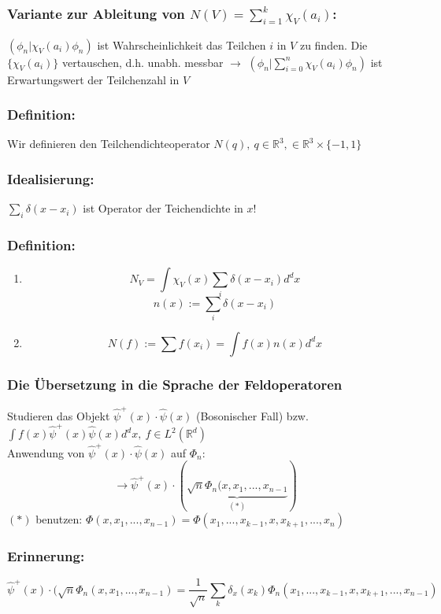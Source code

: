 \documentclass[twoside,a4paper]{scrartcl}
\newcommand{\R}{\mathbb{R}}
\renewcommand{\1}{\mathds{1}}
\newcommand{\ra}{\rightarrow}
\renewcommand{\R}{\mathbb{R}}
\begin{document}
\subsubsection*{Variante zur Ableitung von $N(V)=\sum_{i=1}^k \chi_V(a_i)$:}
$(\phi_n|\chi_V(a_i)\phi_n)$ ist Wahrscheinlichkeit das Teilchen $i$ in $V$ zu finden. Die $\{\chi_V(a_i)\}$ vertauschen, d.h. unabh. messbar $\ra$ $(\phi_n|\sum_{i=0}^n \chi_V(a_i)\phi_n)$ ist Erwartungswert der Teilchenzahl in $V$
\subsubsection*{Definition:}
Wir definieren den Teilchendichteoperator $N(q), \ q \in \R^3, \in \R^3 \times \{-1,1\}$ 


\subsubsection*{Idealisierung:}
$\sum_i \delta(x-x_i)$ ist Operator der Teichendichte in $x$!
\subsubsection*{Definition:}
\begin{enumerate}
\item $$N_V=\int \chi_V(x)\sum_i \delta(x-x_i) d^dx$$
$$n(x):= \sum_i \delta(x-x_i)$$
\item $$N(f):= \sum f(x_i)=\int f(x) n(x) d^dx$$
\end{enumerate}
\subsubsection{Die Übersetzung in die Sprache der Feldoperatoren}
Studieren das Objekt $\hat \psi^+(x) \cdot \hat \psi(x)$ (Bosonischer Fall) bzw. $\int f(x) \hat \psi^+(x)\hat \psi(x)d^dx, \ f\in L^2(\R^d)$\\
Anwendung von $\hat \psi^+(x) \cdot \hat \psi(x)$  auf $\Phi_n$:
$$\ra \hat \psi^+(x) \cdot (\underbrace{\sqrt{n}\Phi_n(x,x_1,...,x_{n-1}}_{(*)})$$
$(*)$ benutzen: $\Phi(x,x_1,...,x_{n-1})=\Phi(x_1,...,x_{k-1},x,x_{k+1},...,x_n)$
\subsubsection*{Erinnerung:}
$$\hat \psi^+(x) \cdot (\sqrt{n}\Phi_n(x,x_1,...,x_{n-1})=\frac{1}{\sqrt{n}} \sum_k \delta_x(x_k) \Phi_n(x_1,...,x_{k-1},x,x_{k+1},...,x_{n-1})$$


% 
 
\end{document}
